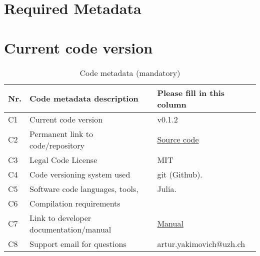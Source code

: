 \section{Required Metadata}
\label{}

\section{Current code version}
\label{}

\begin{table}
\begin{tabular}{lll}
\hline
\textbf{Nr.} & \textbf{Code metadata description} & \textbf{Please fill in this column} \\
\hline
C1 & Current code version & v0.1.2 \\
\hline
C2 & Permanent link to code/repository & \href{https://github.com/MatlabCompat/MatlabCompat.jl}{Source code} \\
\hline
C3 & Legal Code License   & MIT \\
\hline
C4 & Code versioning system used & git (Github). \\
\hline
C5 & Software code languages, tools, & Julia. \\
\hline
C6 & Compilation requirements & \\
\hline
C7 & Link to developer documentation/manual & \href{http://matlabcompat.github.io/help.html}{Manual}\\
\hline
C8 & Support email for questions & artur.yakimovich@uzh.ch\\
\hline
\end{tabular}
\caption{Code metadata (mandatory)}
\end{table}
  
  
  